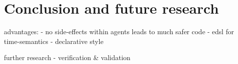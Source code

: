 \section{Conclusion and future research}

advantages: 
	- no side-effects within agents leads to much safer code
	- edsl for time-semantics
	- declarative style
	
further research
	- verification \& validation